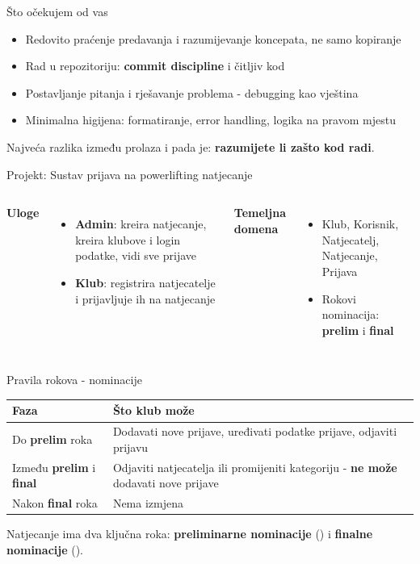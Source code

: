 \begin{frame}{Što očekujem od vas}
\begin{itemize}
  \item Redovito praćenje predavanja i razumijevanje koncepata, ne samo kopiranje
  \item Rad u repozitoriju: \textbf{commit discipline} i čitljiv kod
  \item Postavljanje pitanja i rješavanje problema - debugging kao vještina
  \item Minimalna higijena: formatiranje, error handling, logika na pravom mjestu
\end{itemize}

\vspace{0.4em}
Najveća razlika između prolaza i pada je: \textbf{razumijete li zašto kod radi}.
\end{frame}

\begin{frame}{Projekt: Sustav prijava na powerlifting natjecanje}
\begin{columns}[T]
\textbf{Uloge}
\begin{itemize}
  \item \textbf{Admin}: kreira natjecanje, kreira klubove i login podatke, vidi sve prijave
  \item \textbf{Klub}: registrira natjecatelje i prijavljuje ih na natjecanje
\end{itemize}

\textbf{Temeljna domena}
\begin{itemize}
  \item Klub, Korisnik, Natjecatelj, Natjecanje, Prijava
  \item Rokovi nominacija: \textbf{prelim} i \textbf{final}
\end{itemize}
\end{columns}
\end{frame}

\begin{frame}{Pravila rokova - nominacije}
\begin{tabular}{@{}lp{8cm}@{}}
  \toprule
  \textbf{Faza} & \textbf{Što klub može} \\
  \midrule
  Do \textbf{prelim} roka &
    Dodavati nove prijave, uređivati podatke prijave, odjaviti prijavu \\
  \midrule
  Između \textbf{prelim} i \textbf{final} &
    Odjaviti natjecatelja ili promijeniti kategoriju - \textbf{ne može} dodavati nove prijave \\
  \midrule
  Nakon \textbf{final} roka &
    Nema izmjena \\
  \bottomrule
\end{tabular}

\vspace{0.6em}
Natjecanje ima dva ključna roka: \textbf{preliminarne nominacije} () i \textbf{finalne nominacije} ().
\end{frame}

